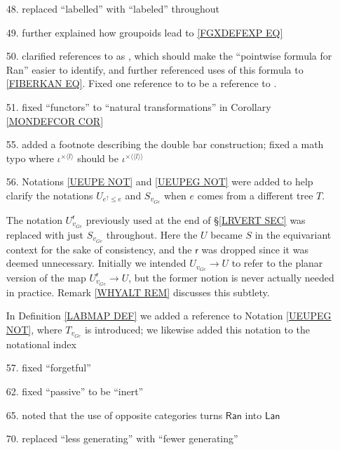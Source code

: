 \documentclass{article}
\begin{document}
\begin{itemize}
\item[48.] replaced ``labelled'' with ``labeled'' throughout

\item[49.] further explained how groupoids lead to \eqref{FGXDEFEXP EQ}

\item[50.] clarified references to \cite[X.3.1]{McL} as \cite[X.3 Thm. 1]{McL}, which should make the ``pointwise formula for Ran'' easier to identify, and further referenced uses of this formula to \eqref{FIBERKAN EQ}.
Fixed one reference to \cite[X.3.1]{McL}
to be a reference to \cite[IX.3]{McL}.

\item[51.] fixed ``functors'' to ``natural transformations'' in Corollary \ref{MONDEFCOR COR}

\item[55.] added a footnote describing the double bar construction;
fixed a math typo where $\iota^{\times \langle l \rangle}$ should be 
$\iota^{\times \langle \langle l \rangle \rangle}$

\item[56.] 
Notations \ref{UEUPE NOT} and \ref{UEUPEG NOT}
were added to help clarify the notations
$U_{e^{\uparrow} \leq e}$
and
$S_{v_{Ge}}$
when $e$ comes from a different tree $T$.

The notation 
$U^{\mathsf{r}}_{v_{Ge}}$
previously used at the end of \S \ref{LRVERT SEC}
was replaced with just
$S_{v_{Ge}}$
throughout. Here the $U$ became $S$ in the equivariant context for the sake of consistency,
and the $\mathsf{r}$ was dropped since it was deemed unnecessary.
Initially we intended 
$U_{v_{Ge}} \to U$
to refer to the planar version of the map 
$U^{\mathsf{r}}_{v_{Ge}} \to U$,
but the former notion is never actually needed in practice.
Remark \ref{WHYALT REM} discusses this subtlety.

In Definition \ref{LABMAP DEF} we added a reference to
Notation \ref{UEUPEG NOT},
where $T_{v_{Ge}}$ is introduced;
we likewise added this notation to the notational index


\item[57.] fixed ``forgetful''

\item[62.] fixed ``passive'' to be ``inert''

\item[65.] noted that the use of opposite categories turns $\mathsf{Ran}$ into $\mathsf{Lan}$

\item[70.] replaced ``less generating'' with ``fewer generating''
      

\end{itemize}
\end{document}
